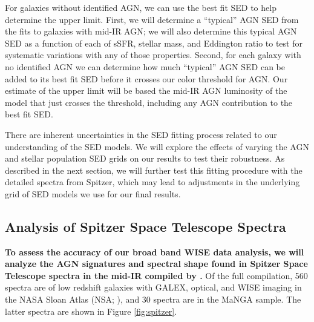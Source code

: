 \documentclass[12pt, preprint]{hacked-aastex}
\begin{document}
For galaxies without identified AGN, we can use the best fit SED to
help determine the upper limit. First, we will determine a ``typical''
AGN SED from the fits to galaxies with mid-IR AGN; we will also
determine this typical AGN SED as a function of each of sSFR, stellar
mass, and Eddington ratio to test for systematic variations with any
of those properties. Second, for each galaxy with no identified AGN we
can determine how much ``typical'' AGN SED can be added to its best
fit SED before it crosses our color threshold for AGN. Our estimate of
the upper limit will be based the mid-IR AGN luminosity of the model
that just crosses the threshold, including any AGN contribution to the
best fit SED.

There are inherent uncertainties in the SED fitting process related to
our understanding of the SED models. We will explore the effects of
varying the AGN and stellar population SED grids on our results to
test their robustness.  As described in the next section, we will
further test this fitting procedure with the detailed spectra from
Spitzer, which may lead to adjustments in the underlying grid of SED
models we use for our final results.


\subsection{Analysis of Spitzer Space Telescope Spectra}
\label{sec:spitzer}

{\bf To assess the accuracy of our broad band WISE data analysis, we
  will analyze the AGN signatures and spectral shape found in Spitzer
  Space Telescope spectra in the mid-IR compiled by
  \cite{lambrides19a}.}  Of the
full compilation, 560 spectra are of low redshift galaxies with GALEX,
optical, and WISE imaging in the NASA Sloan Atlas (NSA;
\cite{blanton11a}), and 30 spectra are in the MaNGA sample.  The
latter spectra are shown in Figure \ref{fig:spitzer}.
\end{document}
